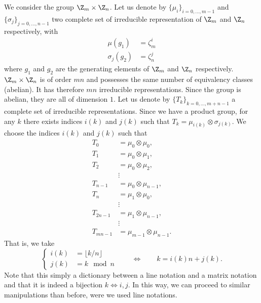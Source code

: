 \documentclass{worksheetclass}
\begin{document}
           We consider the group $\Z_m\times\Z_n$. Let us denote by $\{\mu_i\}_{i=0,\dots,m-1}$ and $\{\sigma_j\}_{j=0,\dots,n-1}$ two complete set of irreducible representation of $\Z_m$ and $\Z_n$ respectively, with
           \begin{align}
               \mu(g_1)&=\zeta^i_m\\
               \sigma_j(g_2)&=\zeta^j_n
           \end{align}
           where $g_1$ and $g_2$ are the generating elements of $\Z_m$ and $\Z_n$ respectively. $\Z_m\times\Z_n$ is of order $mn$ and possesses the same number of equivalency classes (abelian). It has therefore $mn$ irreducible representations. Since the group is abelian, they are all of dimension $1$. Let us denote by $\{T_k\}_{k=0,\dots,m+n-1}$ a complete set of irreducible representations. Since we have a product group, for any $k$ there exists indices $i(k)$ and $j(k)$ such that $T_k=\mu_{i(k)}\otimes\sigma_{j(k)}$. We choose the indices $i(k)$ and $j(k)$ such that
           \begin{align*}
               T_0 &= \mu_0\otimes\mu_0,\\
               T_1 &= \mu_0\otimes\mu_1,\\
               T_2 &= \mu_0\otimes\mu_2,\\
               &\vdots\\
               T_{n-1} &= \mu_0\otimes\mu_{n-1},\\
               T_n &= \mu_1\otimes\mu_0,\\
               &\vdots\\
               T_{2n-1} &= \mu_1\otimes\mu_{n-1},\\
               &\vdots\\
               T_{mn-1} &= \mu_{m-1}\otimes\mu_{n-1}.
           \end{align*}
           That is, we take
           \begin{equation}
               \begin{cases}
                   i(k) &= \lfloor k/n\rfloor\\
                   j(k) &= k\mod n
               \end{cases}\qquad \Leftrightarrow \qquad k=i(k)n+j(k).
           \end{equation}
           Note that this simply a dictionary between a line notation and a matrix notation and that it is indeed a bijection $k\Leftrightarrow i,j$. In this way, we can proceed to similar manipulations than before, were we used line notations. 
\end{document}
